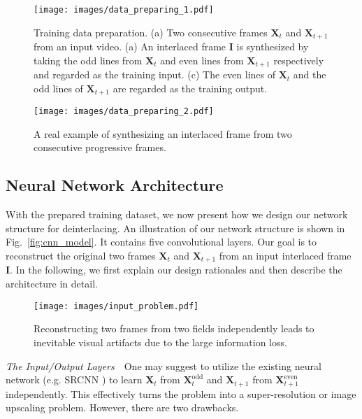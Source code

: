 \begin{figure}[!tp]
	\texttt{[image: images/data\_preparing\_1.pdf]}\\
	\caption{Training data preparation. (a) Two consecutive frames $\mathbf{X}_t$ and $\mathbf{X}_{t+1}$ from an input video. (a) An interlaced frame $\mathbf{I}$ is synthesized by taking the odd lines from $\mathbf{X}_t$ and even lines from $\mathbf{X}_{t+1}$ respectively and regarded as the training input. (c) The even lines of $\mathbf{X}_t$ and the odd lines of $\mathbf{X}_{t+1}$ are regarded as the training output.}\label{fig:data_preparing}
\end{figure}

\begin{figure}[!tp]
	\texttt{[image: images/data\_preparing\_2.pdf]}\\
	\caption{A real example of synthesizing an interlaced frame from two consecutive progressive frames.}\label{fig:data_preparing_real}
\end{figure}

\subsection{Neural Network Architecture}

With the prepared training dataset, we now present how we design our network
structure for deinterlacing. An illustration of our network structure is shown
in Fig.~\ref{fig:cnn_model}. It contains five convolutional layers. Our goal is
to reconstruct the original two frames $\mathbf{X}_t$ and $\mathbf{X}_{t+1}$
from an input interlaced frame $\mathbf{I}$. In the following, we first explain
our  design rationales and then describe the architecture in
detail.

\begin{figure}[!tp]
	\centering
	\texttt{[image: images/input\_problem.pdf]}\\
	\caption{Reconstructing two frames from two fields independently leads to inevitable visual artifacts due to the large information loss.}\label{fig:input_problem}
\end{figure}

\vspace{0.15in}
\noindent\emph{The Input/Output Layers}\,\,\,\,
One may suggest to utilize the existing neural network (e.g. SRCNN
\cite{dong2016image}) to learn $\mathbf{X}_t$ from
$\mathbf{X}^{\text{odd}}_{t}$ and $\mathbf{X}_{t+1}$ from
$\mathbf{X}^{\text{even}}_{t+1}$ independently. This effectively turns the problem into 
a super-resolution or image upscaling problem.
However, there are two drawbacks.

